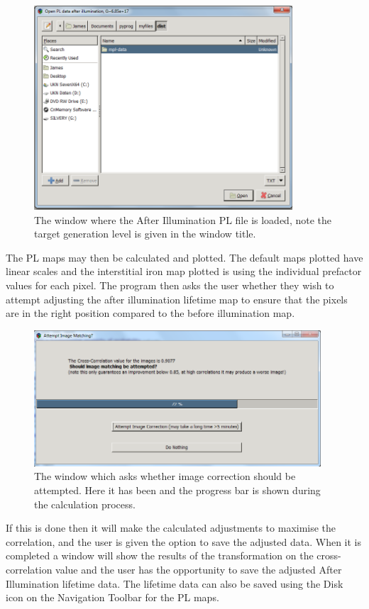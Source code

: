 \documentclass[final,a4paper,oneside,12pt]{article}
\begin{document}
\begin{figure}[h!]
\includegraphics[height=3in]{2loadplafterfile} 
\caption{\label{figure2} The window where the After Illumination PL file is loaded, note the target generation level is given in the window title.}
\end{figure}


 The PL maps may then be calculated and plotted. The default maps plotted have linear scales and the interstitial iron map plotted is using the individual prefactor values for each pixel. The program then asks the user whether they wish to attempt adjusting the after illumination lifetime map to ensure that the pixels are in the right position compared to the before illumination map.\\

\begin{figure}[h!]
\includegraphics[height=2in]{2attemptcorrection}
\caption{\label{figure2} The window which asks whether image correction should be attempted. Here it has been and the progress bar is shown during the calculation process.}
\end{figure}

If this is done then it will make the calculated adjustments to maximise the correlation, and the user is given the option to save the adjusted data. When it is completed a window will show the results of the transformation on the cross-correlation value and the user has the opportunity to save the adjusted After Illumination lifetime data. The lifetime data can also be saved using the Disk icon on the Navigation Toolbar for the PL maps.
\end{document}
